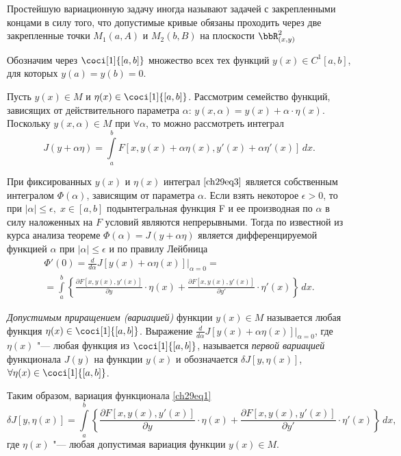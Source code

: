 Простейшую вариационную задачу иногда называют задачей с закрепленными концами в силу того, что допустимые кривые обязаны проходить через две закрепленные точки $M_1(a,A)$ и $M_2(b,B)$ на плоскости $\bbR^2_{(x,y)}$

Обозначим через $\coci[1]{[a,b]}$ множество всех тех функций $y(x)\in C^1[a,b]$, для которых $y(a)=y(b)=0$.

Пусть $y(x)\in M$ и $\eta (x)\in \coci[1]{[a,b]}$. Рассмотрим семейство функций, зависящих от действительного параметра $\alpha$: $y(x,\alpha)=y(x)+\alpha\cdot\eta(x)$. Поскольку $y(x,\alpha)\in M$ при $\forall\alpha$, то можно рассмотреть интеграл 
\begin{equation} \label{ch29eq3}
J(y+\alpha\eta)=\int\limits_a^b F[x,y(x)+\alpha\eta(x),y'(x)+\alpha\eta'(x)]\,dx.
\end{equation}

При фиксированных $y(x)$ и $\eta(x)$ интеграл $\eqref{ch29eq3}$ является собственным интегралом $\Phi(\alpha)$, зависящим от параметра $\alpha$. Если взять некоторое $\epsilon>0$, то при $|\alpha|\le\epsilon,\;x\in[a,b]$ подынтегральная функция F и ее производная по $\alpha$ в силу наложенных на $F$ условий являются непрерывными. Тогда по известной из курса анализа теореме $\Phi(\alpha)=J(y+\alpha\eta)$ является дифференцируемой функцией $\alpha$ при $|\alpha|\le \epsilon$ и по правилу Лейбница
\begin{multline*}
\Phi'(0)=\frac{d}{d\alpha}J[y(x)+\alpha\eta(x)]\biggr|_{\alpha=0}=\\=\int\limits_a^b\left\{ \frac{\partial F[x,y(x),y'(x)]}{\partial y}\cdot \eta(x)+\frac{\partial F[x,y(x),y'(x)]}{\partial y'}\cdot \eta'(x)\right\}\,dx.
\end{multline*}

\begin{defn}
\textit{Допустимым приращением (вариацией)} функции $y(x)\in M$ называется любая функция $\eta (x)\in \coci[1]{[a,b]}$. Выражение $\frac{d}{d\alpha}J[y(x)+\alpha\eta(x)]\bigr|_{\alpha=0}$, где $\eta(x)$ "--- любая функция из $\coci[1]{[a,b]}$,  называется \textit{первой вариацией} функционала $J(y)$ на функции $y(x)$ и обозначается $\delta J[y,\eta(x)]$, $\forall\eta(x)\in\coci[1]{[a,b]}$.
\end{defn}

Таким образом, вариация функционала \eqref{ch29eq1}
\begin{equation} \label{ch29eq4}
\delta J[y,\eta(x)]=\int\limits_a^b\left\{\frac{\partial F[x,y(x),y'(x)]}{\partial y}\cdot\eta(x) + \frac{\partial F[x,y(x),y'(x)]}{\partial y'}\cdot \eta'(x)\right\}\,dx,
\end{equation}
где $\eta(x)$ "--- любая допустимая вариация функции  $y(x)\in M$.

